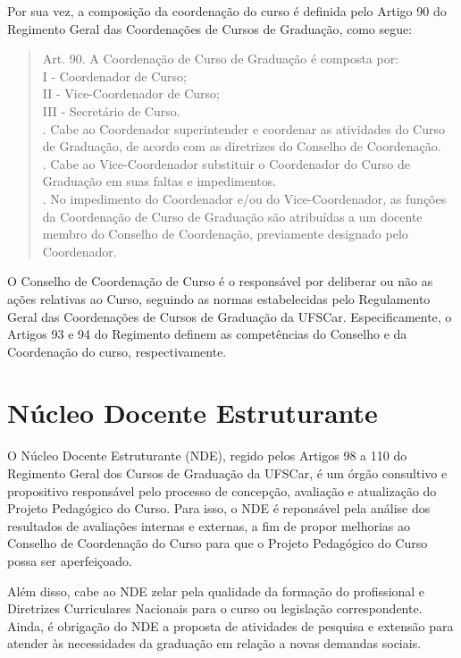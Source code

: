 Por sua vez, a composição da coordenação do curso é definida pelo Artigo 90 do  Regimento Geral das Coordenações de Cursos de Graduação, como segue:

\begin{quote}
Art. 90. A Coordenação de Curso de Graduação é composta por:\\
I - Coordenador de Curso;\\
II - Vice-Coordenador de Curso;\\
III - Secretário de Curso.\\
\textordmasculine. Cabe ao Coordenador superintender e coordenar as atividades do Curso de Graduação, de acordo com as diretrizes do Conselho de Coordenação.\\
\textordmasculine. Cabe ao Vice-Coordenador substituir o Coordenador do Curso de Graduação em suas faltas e impedimentos.\\
\textordmasculine. No impedimento do Coordenador e/ou do Vice-Coordenador, as funções da Coordenação de Curso de Graduação são atribuídas a um docente membro do Conselho de Coordenação, previamente designado pelo Coordenador.
\end{quote}

O Conselho de Coordenação de Curso é o responsável por deliberar ou não as ações relativas ao Curso, seguindo as normas estabelecidas pelo Regulamento Geral das Coordenações de Cursos de Graduação da UFSCar. Especificamente, o Artigos 93 e 94 do Regimento definem as competências do Conselho e da Coordenação do curso, respectivamente.




\section{Núcleo Docente Estruturante}

O Núcleo Docente Estruturante (NDE), regido pelos Artigos 98 a 110 do Regimento Geral dos Cursos de Graduação da UFSCar, é um órgão consultivo e propositivo responsável pelo processo de concepção, avaliação e atualização do Projeto Pedagógico do Curso. Para isso, o NDE é reponsável pela análise dos resultados de avaliações internas e externas, a fim de propor melhorias ao Conselho de Coordenação do Curso para que o Projeto Pedagógico do Curso possa ser aperfeiçoado.

Além disso, cabe ao NDE zelar pela qualidade da formação do profissional e Diretrizes Curriculares Nacionais para o curso ou legislação correspondente. Ainda, é obrigação do NDE a proposta de atividades de pesquisa e extensão para atender às necessidades da graduação em relação a novas demandas sociais.

